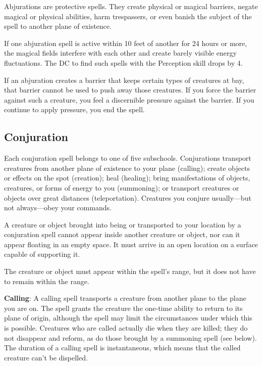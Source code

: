 				
Abjurations are protective spells. They create physical or magical barriers, negate magical or physical abilities, harm trespassers, or even banish the subject of the spell to another plane of existence. 
				
If one abjuration spell is active within 10 feet of another for 24 hours or more, the magical fields interfere with each other and create barely visible energy fluctuations. The DC to find such spells with the Perception skill drops by 4.
				
If an abjuration creates a barrier that keeps certain types of creatures at bay, that barrier cannot be used to push away those creatures. If you force the barrier against such a creature, you feel a discernible pressure against the barrier. If you continue to apply pressure, you end the spell.
				
\subsection{Conjuration}

				
Each conjuration spell belongs to one of five subschools. Conjurations transport creatures from another plane of existence to your plane (calling); create objects or effects on the spot (creation); heal (healing); bring manifestations of objects, creatures, or forms of energy to you (summoning); or transport creatures or objects over great distances (teleportation). Creatures you conjure usually---but not always---obey your commands.
				
A creature or object brought into being or transported to your location by a conjuration spell cannot appear inside another creature or object, nor can it appear floating in an empty space. It must arrive in an open location on a surface capable of supporting it.
				
The creature or object must appear within the spell's range, but it does not have to remain within the range.
				
\textbf{Calling}: A calling spell transports a creature from another plane to the plane you are on. The spell grants the creature the one-time ability to return to its plane of origin, although the spell may limit the circumstances under which this is possible. Creatures who are called actually die when they are killed; they do not disappear and reform, as do those brought by a summoning spell (see below). The duration of a calling spell is instantaneous, which means that the called creature can't be dispelled.
				
